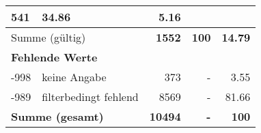 \begin{longtable}{lXrrr}
       \num{541} &
       \num[round-mode=places,round-precision=2]{34.86} &
         \num[round-mode=places,round-precision=2]{5.16} \\
     \midrule
     \multicolumn{2}{l}{Summe (gültig)} &
       \textbf{\num{1552}} &
     \textbf{\num{100}} &
       \textbf{\num[round-mode=places,round-precision=2]{14.79}} \\
     \multicolumn{5}{l}{\textbf{Fehlende Werte}}\\
       -998 &
       keine Angabe &
         \num{373} &
        - &
         \num[round-mode=places,round-precision=2]{3.55} \\
       -989 &
       filterbedingt fehlend &
         \num{8569} &
        - &
         \num[round-mode=places,round-precision=2]{81.66} \\
     \midrule
     \multicolumn{2}{l}{\textbf{Summe (gesamt)}} &
          \textbf{\num{10494}} &
        \textbf{-} &
        \textbf{\num{100}} \\
     \bottomrule
     \end{longtable}
     
